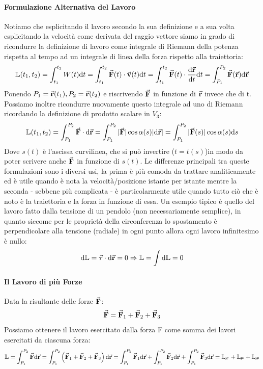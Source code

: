 \documentclass{article}
\newcommand{\then}{\ensuremath{\Rightarrow}}
\renewcommand{\v}{\va{v}}
\renewcommand{\r}{\va{r}}
\newcommand{\tauvt}{\va{\tau}}
\newcommand{\F}{\va{F}}
\begin{document}
\paragraph{Formulazione Alternativa del Lavoro}
Notiamo che esplicitando il lavoro secondo la sua definizione e a sua volta esplicitando la velocità come derivata del raggio vettore siamo in grado di ricondurre la definizione di lavoro come integrale di Riemann della potenza rispetta al tempo ad un integrale di linea della forza rispetto alla traiettoria:
\[\mathbb{L}(t_1,t_2)=\int_{t_1}^{t_2}W(t)\dd t=\int_{t_1}^{t_2}\F(t)\cdot\v(t)\dd t=\int_{t_1}^{t_2}\F(t)\cdot\dv{\r}{t}\dd t=\int_{P_1}^{P_2}\F(\r)\dd\r\]
Ponendo $P_1=\r(t_1),P_2=\r(t_2)$ e riscrivendo $\F$ in funzione di $\r$ invece che di t.
Possiamo inoltre ricondurre nuovamente questo integrale ad uno di Riemann ricordando la definizione di prodotto scalare in $V_3$:
\[\mathbb{L}(t_1,t_2)=\int_{P_1}^{P_2}\F\cdot\dd\r=\int_{P_1}^{P_2}|\F|\cos\alpha(s)|\dd \r|=\int_{P_1}^{P_2}|\F(s)|\cos\alpha(s)\dd s\]
Dove $s(t)$ è l'ascissa curvilinea, che si può invertire ($t=t(s)$)in modo da poter scrivere anche $\F$ in funzione di $s(t)$.
Le differenze principali tra queste formulazioni sono i diversi usi, la prima è più comoda da trattare analiticamente ed è utile quando è nota la velocità/posizione istante per istante mentre la seconda - sebbene più complicata - è particolarmente utile quando tutto ciò che è noto è la traiettoria e la forza in funzione di essa. Un esempio tipico è quello del lavoro fatto dalla tensione di un pendolo (non necessariamente semplice), in quanto siccome per le proprietà della circonferenza lo spostamento è perpendicolare alla tensione (radiale) in ogni punto allora ogni lavoro infinitesimo è nullo:
\[\dd\mathbb{L}=\tauvt\cdot\dd\r=0\then \mathbb{L}=\int\dd\mathbb{L}=0\]
\paragraph{Il Lavoro di più Forze}
Data la risultante delle forze $\F$:
\[\F=\F_1+\F_2+\F_3\]
Possiamo ottenere il lavoro esercitato dalla forza F come somma dei lavori esercitati da ciascuna forza:
\[\mathbb{L}=\int_{P_1}^{P_2}\F\dd\r=\int_{P_1}^{P_2}\left(\F_1+\F_2+\F_3\right)\dd\r=\int_{P_1}^{P_2}\F_1\dd\r+\int_{P_1}^{P_2}\F_2\dd\r+\int_{P_1}^{P_2}\F_3\dd\r=\mathbb{L_1}+\mathbb{L_2}+\mathbb{L_3}\]
\end{document}
